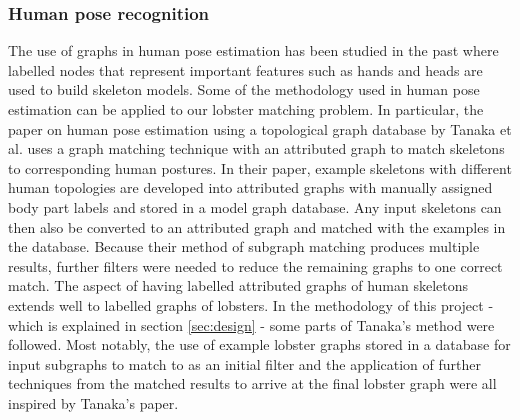 \subsubsection{Human pose recognition}
The use of graphs in human pose estimation has been studied in the past
\cite{human-pose, human-skeleton} where labelled nodes that represent important features such as hands and heads are used to build skeleton models.
\n
Some of the methodology used in human pose estimation can be applied to our lobster matching problem. In particular, the paper on human pose estimation using a topological graph database by Tanaka et al. \cite{human-pose} uses a graph matching technique with an attributed graph to match skeletons to corresponding human postures. In their paper, example skeletons with different human topologies are developed into attributed graphs with manually assigned body part labels and stored in a model graph database. Any input skeletons can then also be converted to an attributed graph and matched with the examples in the database. Because their method of subgraph matching produces multiple results, further filters were needed to reduce the remaining graphs to one correct match. 
\noindent
The aspect of having labelled attributed graphs of human skeletons extends well to labelled graphs of lobsters. In the methodology of this project - which is explained in section \ref{sec:design} - some parts of Tanaka's method were followed. Most notably, the use of example lobster graphs stored in a database for input subgraphs to match to as an initial filter and the application of further techniques from the matched results to arrive at the final lobster graph were all inspired by Tanaka's paper.
 
